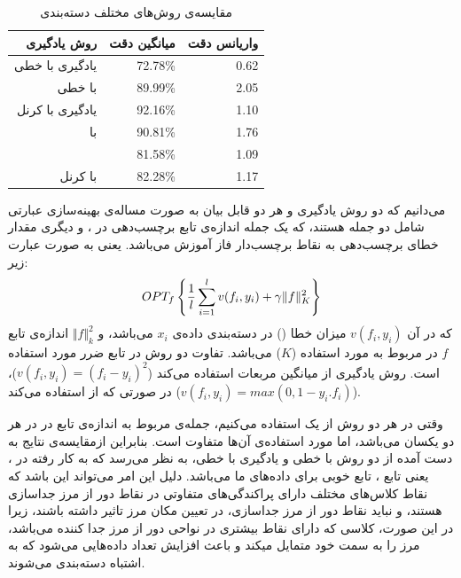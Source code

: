 \documentclass[11pt]{article}
\begin{document}
\begin{table}
\caption{مقایسه‌ی روش‌های مختلف دسته‌بندی}
\label{table:results_1}
\begin{center}
\begin{tabular}{rrr}
\hline
\hline
روش یادگیری & میانگین دقت & واریانس دقت \\
\hline
\hline
یادگیری \gaussianprocess{} با {} خطی & 72.78\% & 0.62\\
\SVM{} با {} خطی & 89.99\% & 2.05 \\
 یادگیری \gaussianprocess{} با کرنل \RBF{} & 92.16\% & 1.10 \\
\SVM{} با {} \RBF{} & 90.81\% & 1.76 \\
\LGC{} & 81.58\% & 1.09\\
\SVM{} با کرنل \difL{} & 82.28\% & 1.17 \\
\hline

\end{tabular}
\end{center}
\end{table}

می‌دانیم که دو روش یادگیری  \gaussianprocess{} و \SVM{} هر دو قابل بیان به صورت مساله‌ی بهینه‌سازی عبارتی شامل دو جمله هستند، که یک جمله اندازه‌ی تابع برچسب‌دهی در \RKHS{}، و دیگری مقدار خطای برچسب‌دهی به نقاط برچسب‌دار فاز آموزش می‌باشد. یعنی به صورت عبارت زیر:
\begin{eqnarray}
OPT_f\left\{ \displaystyle {1 \over l}\sum_{i=1}^l v(f_i,y_i) + \gamma \Vert f \Vert_K^2\right\}
\end{eqnarray}
که در آن $v(f_i,y_i)$  میزان خطا (\lossfunction{}) در دسته‌بندی داده‌ی $x_i$ می‌باشد، و $\Vert f \Vert_k^2$ اندازه‌ی تابع $f$ در \RKHS{} مربوط به  مورد استفاده ($K$) می‌باشد.
تفاوت دو روش در تابع ضرر مورد استفاده است. روش یادگیری \gaussianprocess{} از \lossfunction{} میانگین مربعات استفاده می‌کند ($v(f_i,y_i) = (f_i-y_i)^2$)، در صورتی که \SVM{} از \lossfunction{} \hinge{} استفاده می‌کند ($v(f_i,y_i) = max(0,1-y_i.f_i)$).

 وقتی در هر دو روش از یک  استفاده می‌کنیم، جمله‌ی مربوط به اندازه‌ی تابع در \RKHS{} در هر دو یکسان می‌باشد، اما \lossfunction{} مورد استفاده‌ی آن‌ها متفاوت است. بنابراین ازمقایسه‌ی نتایج به دست آمده از دو روش \SVM{} با  خطی و یادگیری \gaussianprocess{} با  خطی، به نظر می‌رسد که \lossfunction{} به کار رفته در \SVM{}، یعنی تابع \hinge{}، تابع خوبی برای داده‌های ما می‌باشد.
دلیل این امر می‌تواند این باشد که نقاط کلاس‌های مختلف دارای پراکندگی‌های متفاوتی در نقاط دور از مرز جداسازی هستند، و نباید نقاط دور از مرز جداسازی، در تعیین مکان مرز تاثیر داشته باشند، زیرا در این صورت، کلاسی که دارای نقاط بیشتری در نواحی دور از مرز جدا کننده می‌باشد، مرز را به سمت خود متمایل میکند و باعث افزایش تعداد داده‌هایی می‌شود که به اشتباه دسته‌بندی می‌شوند.
\end{document}
